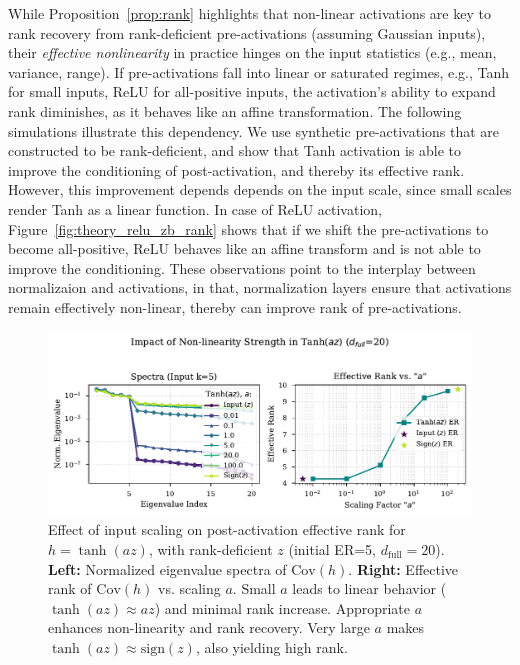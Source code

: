\documentclass{article}
\begin{document}
While Proposition~\ref{prop:rank} highlights that non-linear activations are key to rank recovery from rank-deficient pre-activations (assuming Gaussian inputs), their \emph{effective nonlinearity} in practice hinges on the input statistics (e.g., mean, variance, range). If pre-activations fall into linear or saturated regimes, e.g., Tanh for small inputs, ReLU for all-positive inputs, the activation's ability to expand rank diminishes, as it behaves like an affine transformation. The following simulations illustrate this dependency. We use synthetic pre-activations that are constructed to be rank-deficient, and show that Tanh activation is able to improve the conditioning of post-activation, and thereby its effective rank. However, this improvement depends depends on the input scale, since small scales render Tanh as a linear function. In case of ReLU activation, Figure~\ref{fig:theory_relu_zb_rank} shows that if we shift the pre-activations to become all-positive, ReLU behaves like an affine transform and is not able to improve the conditioning. These observations point to the interplay between normalizaion and activations, in that, normalization layers ensure that activations remain effectively non-linear, thereby can improve rank of pre-activations. 

\begin{figure}[ht!]
    \centering
    \includegraphics[width=0.7\linewidth]{figures/theory_tanh_az_rank.pdf} %
    \caption{Effect of input scaling on post-activation effective rank for $h = \tanh(az)$, with rank-deficient $z$ (initial ER=5, $d_{\text{full}}=20$). \textbf{Left:} Normalized eigenvalue spectra of $\mathrm{Cov}(h)$. \textbf{Right:} Effective rank of $\mathrm{Cov}(h)$ vs. scaling $a$. Small $a$ leads to linear behavior ($\tanh(az) \approx az$) and minimal rank increase. Appropriate $a$ enhances non-linearity and rank recovery. Very large $a$ makes $\tanh(az) \approx \mathrm{sign}(z)$, also yielding high rank.}
    \label{fig:theory_tanh_az_rank}
\end{figure}

\end{document}
